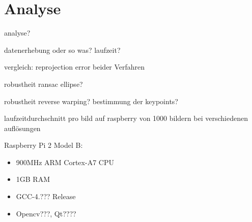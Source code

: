 \chapter{Analyse}
analyse?

datenerhebung oder so was? laufzeit?

vergleich: reprojection error beider Verfahren

robustheit ransac ellipse?

robustheit reverse warping? bestimmung der keypoints?

laufzeitdurchschnitt pro bild  auf raspberry von 1000 bildern bei verschiedenen auflösungen

Raspberry Pi 2 Model B:
\begin{itemize}
	\item 900MHz ARM Cortex-A7 CPU
	\item 1GB RAM
	\item GCC-4.??? Release
	\item Opencv???, Qt????
\end{itemize}